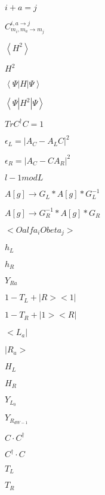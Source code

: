 \documentclass{article}
\begin{document}
$i+a=j$
\pagebreak

$C^{i,a\rightarrow j}_{m_i,m_a\rightarrow m_j}$
\pagebreak

$\left<H^2\right>$
\pagebreak

$H^2$
\pagebreak

$\left<\Psi|H|\Psi\right>$
\pagebreak

$\left<\Psi|H^2|\Psi\right>$
\pagebreak

$Tr C^{\dagger} C = 1$
\pagebreak

$\epsilon_L=\big|A_C-A_LC\big|^2$
\pagebreak

$\epsilon_R=\big|A_C-CA_R\big|^2$
\pagebreak

$l-1 mod L$
\pagebreak

$A[g] \rightarrow G_L*A[g]*G_L^{-1}$
\pagebreak

$A[g] \rightarrow G_R^{-1}*A[g]*G_R$
\pagebreak

$<Oalfa_i Obeta_j>$
\pagebreak

$h_L$
\pagebreak

$h_R$
\pagebreak

$Y_{Ra}$
\pagebreak

$1-T_L+|R><1|$
\pagebreak

$1-T_R+|1><R|$
\pagebreak

$<L_a|$
\pagebreak

$|R_a>$
\pagebreak

$H_L$
\pagebreak

$H_R$
\pagebreak

$Y_{L_{0}}$
\pagebreak

$Y_{R_{dW-1}}$
\pagebreak

$C \cdot C^{\dagger}$
\pagebreak

$C^{\dagger} \cdot C$
\pagebreak

$T_L$
\pagebreak

$T_R$
\pagebreak
\end{document}
